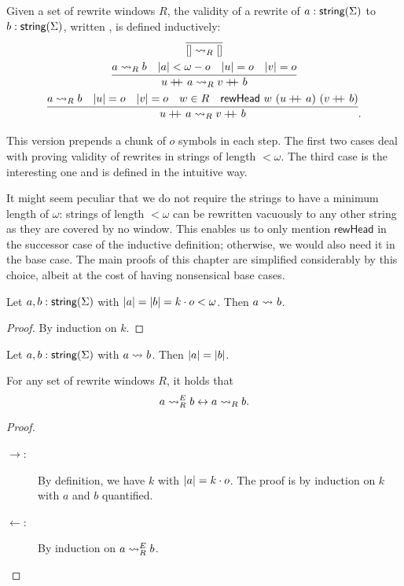 \begin{definition}[Validity] 
  Given a set of rewrite windows $R$, the validity of a rewrite of $a : \textsf{string}{(\Sigma)}$ to $b : \textsf{string}{(\Sigma)}$, written , is defined inductively:  
  \begin{gather*}
    \infer{\nil \strent{R} \nil}{} \\
    \infer{u\concat{} a \strent{R} v \concat{} b}{a \strent{R} b \quad \length{a} < \omega - o \quad \length{u} = o \quad \length{v} = o} \\
    \infer{u \concat{} a \strent{R} v \concat{} b}{a \strent{R} b \quad \length{u} = o \quad \length{v} = o \quad w \in R \quad \rewHead{w}{(u\concat{}a)}{(v \concat{} b)}}.
  \end{gather*}
\end{definition}

This version prepends a chunk of $o$ symbols in each step. The first two cases deal with proving validity of rewrites in strings of length $< \omega$. The third case is the interesting one and is defined in the intuitive way.

\begin{remark}
  It might seem peculiar that we do not require the strings to have a minimum length of $\omega$: strings of length $< \omega$ can be rewritten vacuously to any other string as they are covered by no window. 
  This enables us to only mention $\textsf{rewHead}$ in the successor case of the inductive definition; otherwise, we would also need it in the base case. The main proofs of this chapter are simplified considerably by this choice, albeit at the cost of having nonsensical base cases.
\end{remark}

\begin{proposition}\label{lem:vacuous}
  Let $a, b : \textsf{string}{(\Sigma)}$ with $|a| = |b| = k \cdot o < \omega$. Then $a \rightsquigarrow_{} b$. 
\end{proposition}
\begin{proof}
  By induction on $k$.
\end{proof}

\begin{proposition}
  Let $a, b : \textsf{string}{(\Sigma)}$ with $a \rightsquigarrow_{} b$. Then $|a| = |b|$. 
\end{proposition}

\begin{lemma}\label{lem:agree_valid}
  For any set of rewrite windows $R$, it holds that 
  \[a \rightsquigarrow_{R}^E b \leftrightarrow a \rightsquigarrow_{R} b. \]
\end{lemma}
\begin{proof}
  \begin{description}
    \item[$\rightarrow$:]
      By definition, we have $k$ with $|a| = k \cdot o$. The proof is by induction on $k$ with $a$ and $b$ quantified.
    \item[$\leftarrow$:]
      By induction on $a \rightsquigarrow_{R}^E b$. 
  \end{description}
\end{proof}

